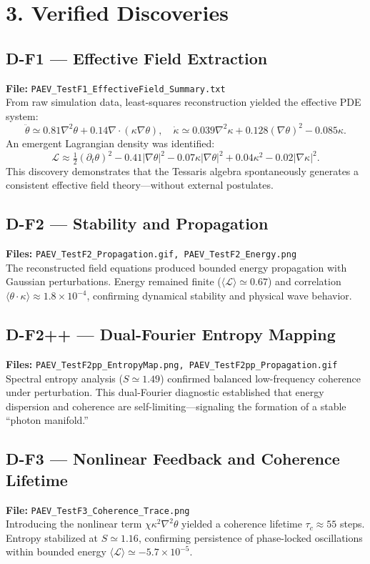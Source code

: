 \documentclass[12pt]{article}
\begin{document}
\section*{3. Verified Discoveries}

\subsection*{D-F1 — Effective Field Extraction}
\textbf{File:} \texttt{PAEV\_TestF1\_EffectiveField\_Summary.txt}\\
From raw simulation data, least-squares reconstruction yielded the effective PDE system:
\[
\ddot{\theta} \simeq 0.81\nabla^2\theta + 0.14\nabla\!\cdot(\kappa\nabla\theta), \quad
\dot{\kappa} \simeq 0.039\nabla^2\kappa + 0.128(\nabla\theta)^2 - 0.085\kappa.
\]
An emergent Lagrangian density was identified:
\[
\mathcal{L} \approx \tfrac{1}{2}(\partial_t\theta)^2 - 0.41|\nabla\theta|^2 - 0.07\kappa|\nabla\theta|^2 + 0.04\kappa^2 - 0.02|\nabla\kappa|^2.
\]
This discovery demonstrates that the Tessaris algebra spontaneously generates a consistent effective field theory—without external postulates.

\subsection*{D-F2 — Stability and Propagation}
\textbf{Files:} \texttt{PAEV\_TestF2\_Propagation.gif, PAEV\_TestF2\_Energy.png}\\
The reconstructed field equations produced bounded energy propagation with Gaussian perturbations.
Energy remained finite ($\langle\mathcal{L}\rangle\simeq0.67$) and correlation $\langle\theta\!\cdot\!\kappa\rangle\approx1.8\times10^{-4}$, confirming dynamical stability and physical wave behavior.

\subsection*{D-F2++ — Dual-Fourier Entropy Mapping}
\textbf{Files:} \texttt{PAEV\_TestF2pp\_EntropyMap.png, PAEV\_TestF2pp\_Propagation.gif}\\
Spectral entropy analysis ($S\simeq1.49$) confirmed balanced low-frequency coherence under perturbation.
This dual-Fourier diagnostic established that energy dispersion and coherence are self-limiting—signaling the formation of a stable “photon manifold.”

\subsection*{D-F3 — Nonlinear Feedback and Coherence Lifetime}
\textbf{File:} \texttt{PAEV\_TestF3\_Coherence\_Trace.png}\\
Introducing the nonlinear term $\chi\kappa^2\nabla^2\theta$ yielded a coherence lifetime $\tau_c\approx55$ steps.
Entropy stabilized at $S\simeq1.16$, confirming persistence of phase-locked oscillations within bounded energy $\langle\mathcal{L}\rangle\simeq-5.7\times10^{-5}$.
\end{document}
